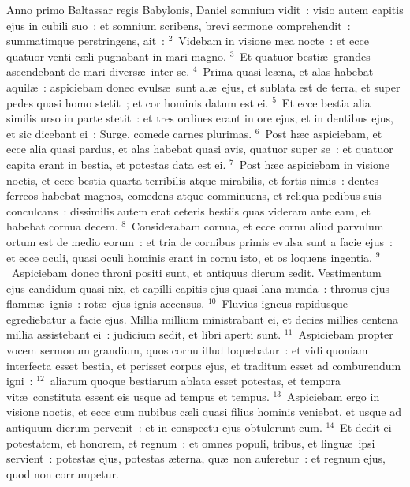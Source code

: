 \lettrine[lines=10,image=true,loversize=0.05,lraise=-0.03]{A}{}nno primo Baltassar regis Babylonis, Daniel somnium vidit~: visio autem capitis ejus in cubili suo~: et somnium scribens, brevi sermone comprehendit~: summatimque perstringens, ait~:
${}^{2}$~Videbam in visione mea nocte~: et ecce quatuor venti c\ae li pugnabant in mari magno.
${}^{3}$~Et quatuor besti\ae\ grandes ascendebant de mari divers\ae\ inter se.
${}^{4}$~Prima quasi le\ae na, et alas habebat aquil\ae~: aspiciebam donec evuls\ae\ sunt al\ae\ ejus, et sublata est de terra, et super pedes quasi homo stetit~; et cor hominis datum est ei.
${}^{5}$~Et ecce bestia alia similis urso in parte stetit~: et tres ordines erant in ore ejus, et in dentibus ejus, et sic dicebant ei~: Surge, comede carnes plurimas.
${}^{6}$~Post h\ae c aspiciebam, et ecce alia quasi pardus, et alas habebat quasi avis, quatuor super se~: et quatuor capita erant in bestia, et potestas data est ei.
${}^{7}$~Post h\ae c aspiciebam in visione noctis, et ecce bestia quarta terribilis atque mirabilis, et fortis nimis~: dentes ferreos habebat magnos, comedens atque comminuens, et reliqua pedibus suis conculcans~: dissimilis autem erat ceteris bestiis quas videram ante eam, et habebat cornua decem.
${}^{8}$~Considerabam cornua, et ecce cornu aliud parvulum ortum est de medio eorum~: et tria de cornibus primis evulsa sunt a facie ejus~: et ecce oculi, quasi oculi hominis erant in cornu isto, et os loquens ingentia.
${}^{9}$~Aspiciebam donec throni positi sunt, et antiquus dierum sedit. Vestimentum ejus candidum quasi nix, et capilli capitis ejus quasi lana munda~: thronus ejus flamm\ae\ ignis~: rot\ae\ ejus ignis accensus.
${}^{10}$~Fluvius igneus rapidusque egrediebatur a facie ejus. Millia millium ministrabant ei, et decies millies centena millia assistebant ei~: judicium sedit, et libri aperti sunt.
${}^{11}$~Aspiciebam propter vocem sermonum grandium, quos cornu illud loquebatur~: et vidi quoniam interfecta esset bestia, et perisset corpus ejus, et traditum esset ad comburendum igni~:
${}^{12}$~aliarum quoque bestiarum ablata esset potestas, et tempora vit\ae\ constituta essent eis usque ad tempus et tempus.
${}^{13}$~Aspiciebam ergo in visione noctis, et ecce cum nubibus c\ae li quasi filius hominis veniebat, et usque ad antiquum dierum pervenit~: et in conspectu ejus obtulerunt eum.
${}^{14}$~Et dedit ei potestatem, et honorem, et regnum~: et omnes populi, tribus, et lingu\ae\ ipsi servient~: potestas ejus, potestas \ae terna, qu\ae\ non auferetur~: et regnum ejus, quod non corrumpetur.


